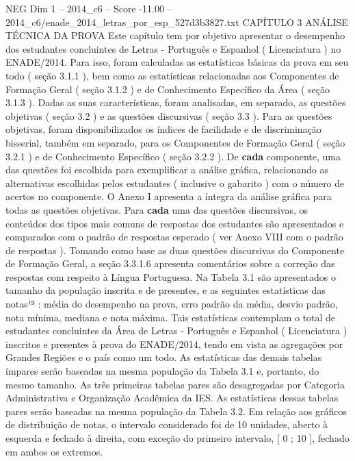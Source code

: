 \begin{textsample}{NEG Dim 1 – 2014\_c6 – Score -11.00 – 2014\_c6/enade\_2014\_letras\_por\_esp\_527d3b3827.txt}  \label{ex:f1_neg_003}
CAPÍTULO 3 ANÁLISE TÉCNICA DA PROVA Este capítulo tem por objetivo apresentar o desempenho dos estudantes concluintes de Letras - Português e Espanhol ( Licenciatura ) no ENADE/2014.
Para isso, foram calculadas as estatísticas básicas da prova em seu todo ( seção 3.1.1 ), bem como as estatísticas relacionadas aos Componentes de Formação Geral ( seção 3.1.2 ) e de Conhecimento Específico da Área ( seção 3.1.3 ).
Dadas as suas características, foram analisadas, em separado, as questões objetivas ( seção 3.2 ) e as questões discursivas ( seção 3.3 ).
Para as questões objetivas, foram disponibilizados os índices de facilidade e de discriminação bisserial, também em separado, para os Componentes de Formação Geral ( seção 3.2.1 ) e de Conhecimento Específico ( seção 3.2.2 ).
De \textbf{cada} componente, uma das questões foi escolhida para exemplificar a análise gráfica, relacionando as alternativas escolhidas pelos estudantes ( inclusive o gabarito ) com o número de acertos no componente.
O Anexo I apresenta a íntegra da análise gráfica para todas as questões objetivas.
Para \textbf{cada} uma das questões discursivas, os conteúdos dos tipos mais comuns de respostas dos estudantes são apresentados e comparados com o padrão de respostas esperado ( ver Anexo VIII com o padrão de respostas ).
Tomando como base as duas questões discursivas do Componente de Formação Geral, a seção 3.3.1.6 apresenta comentários sobre a correção das respostas com respeito à Língua Portuguesa.
Na Tabela 3.1 são apresentados o tamanho da população inscrita e de presentes, e as seguintes estatísticas das notas¹⁹ : média do desempenho na prova, erro padrão da média, desvio padrão, nota mínima, mediana e nota máxima.
Tais estatísticas contemplam o total de estudantes concluintes da Área de Letras - Português e Espanhol ( Licenciatura ) inscritos e presentes à prova do ENADE/2014, tendo em vista as agregações por Grandes Regiões e o país como um todo.
As estatísticas das demais tabelas ímpares serão baseadas na mesma população da Tabela 3.1 e, portanto, do mesmo tamanho.
As três primeiras tabelas pares são desagregadas por Categoria Administrativa e Organização Acadêmica da IES.
As estatísticas dessas tabelas pares serão baseadas na mesma população da Tabela 3.2.
Em relação aos gráficos de distribuição de notas, o intervalo considerado foi de 10 unidades, aberto à esquerda e fechado à direita, com exceção do primeiro intervalo, [ 0 ; 10 ], fechado em ambos os extremos.

\end{textsample}
